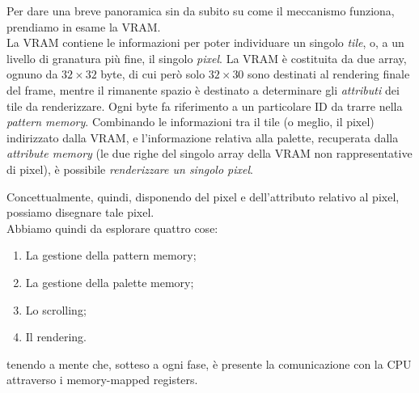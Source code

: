 \documentclass[11pt]{article}
\begin{document}
Per dare una breve panoramica sin da subito su come il meccanismo funziona, prendiamo in esame la VRAM.\\
La VRAM contiene le informazioni per poter individuare un singolo \emph{tile}, o, a un livello di granatura più fine, il singolo \emph{pixel}. La VRAM è costituita da due array, ognuno da $32\times32$ byte, di cui però solo $32\times30$ sono destinati al rendering finale del frame, mentre il rimanente spazio è destinato a determinare gli \emph{attributi} dei tile da renderizzare. Ogni byte fa riferimento a un particolare ID da trarre nella \emph{pattern memory}. Combinando le informazioni tra il tile (o meglio, il pixel) indirizzato dalla VRAM, e l'informazione relativa alla palette, recuperata dalla \emph{attribute memory} (le due righe del singolo array della VRAM non rappresentative di pixel), è possibile \emph{renderizzare un singolo pixel}.

Concettualmente, quindi, disponendo del pixel e dell'attributo relativo al pixel, possiamo disegnare tale pixel.\\
Abbiamo quindi da esplorare quattro cose:
\begin{enumerate}
	\item{
		La gestione della pattern memory;
	}
	\item{
		La gestione della palette memory;
	}
	\item{
		Lo scrolling;
	}
	\item{
		Il rendering.
	}
\end{enumerate}
tenendo a mente che, sotteso a ogni fase, è presente la comunicazione con la CPU attraverso i memory-mapped registers.
\clearpage
\end{document}
